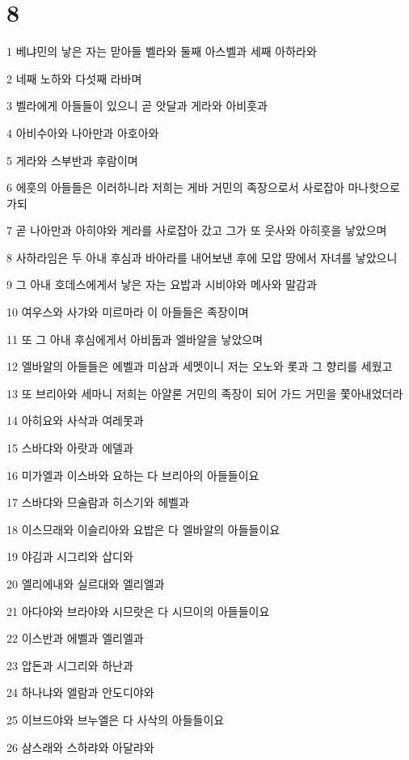 \chapter{8}

\par 1 베냐민의 낳은 자는 맏아들 벨라와 둘째 아스벨과 세째 아하라와
\par 2 네째 노하와 다섯째 라바며
\par 3 벨라에게 아들들이 있으니 곧 앗달과 게라와 아비훗과
\par 4 아비수아와 나아만과 아호아와
\par 5 게라와 스부반과 후람이며
\par 6 에훗의 아들들은 이러하니라 저희는 게바 거민의 족장으로서 사로잡아 마나핫으로 가되
\par 7 곧 나아만과 아히야와 게라를 사로잡아 갔고 그가 또 웃사와 아히훗을 낳았으며
\par 8 사하라임은 두 아내 후심과 바아라를 내어보낸 후에 모압 땅에서 자녀를 낳았으니
\par 9 그 아내 호데스에게서 낳은 자는 요밥과 시비야와 메사와 말감과
\par 10 여우스와 사갸와 미르마라 이 아들들은 족장이며
\par 11 또 그 아내 후심에게서 아비둡과 엘바알을 낳았으며
\par 12 엘바알의 아들들은 에벨과 미삼과 세멧이니 저는 오노와 롯과 그 향리를 세웠고
\par 13 또 브리아와 세마니 저희는 아얄론 거민의 족장이 되어 가드 거민을 쫓아내었더라
\par 14 아히요와 사삭과 여레못과
\par 15 스바댜와 아랏과 에델과
\par 16 미가엘과 이스바와 요하는 다 브리아의 아들들이요
\par 17 스바댜와 므술람과 히스기와 헤벨과
\par 18 이스므래와 이슬리아와 요밥은 다 엘바알의 아들들이요
\par 19 야김과 시그리와 삽디와
\par 20 엘리에내와 실르대와 엘리엘과
\par 21 아다야와 브라야와 시므랏은 다 시므이의 아들들이요
\par 22 이스반과 에벨과 엘리엘과
\par 23 압돈과 시그리와 하난과
\par 24 하나냐와 엘람과 안도디야와
\par 25 이브드야와 브누엘은 다 사삭의 아들들이요
\par 26 삼스래와 스하랴와 아달랴와
